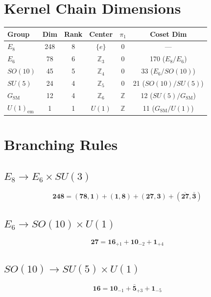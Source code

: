 \documentclass[11pt,a4paper,openright]{book}
\theoremstyle{plain}
\theoremstyle{definition}
\newcommand{\SM}{\mathrm{SM}}
\newcommand{\Z}{\mathbb{Z}}
\begin{document}
\section{Kernel Chain Dimensions}

\begin{center}
\begin{tabular}{lccccc}
\toprule
\textbf{Group} & \textbf{Dim} & \textbf{Rank} & \textbf{Center} & $\pi_1$ & \textbf{Coset Dim} \\
\midrule
$E_8$ & 248 & 8 & $\{e\}$ & $0$ & --- \\
$E_6$ & 78 & 6 & $\Z_3$ & $0$ & 170 ($E_8/E_6$) \\
$SO(10)$ & 45 & 5 & $\Z_4$ & $0$ & 33 ($E_6/SO(10)$) \\
$SU(5)$ & 24 & 4 & $\Z_5$ & $0$ & 21 ($SO(10)/SU(5)$) \\
$G_{\SM}$ & 12 & 4 & $\Z_6$ & $\Z$ & 12 ($SU(5)/G_{\SM}$) \\
$U(1)_{\mathrm{em}}$ & 1 & 1 & $U(1)$ & $\Z$ & 11 ($G_{\SM}/U(1)$) \\
\bottomrule
\end{tabular}
\end{center}

\section{Branching Rules}

\subsection{$E_8 \to E_6 \times SU(3)$}
\begin{equation}
\mathbf{248} = (\mathbf{78}, \mathbf{1}) + (\mathbf{1}, \mathbf{8}) + (\mathbf{27}, \mathbf{3}) + (\overline{\mathbf{27}}, \bar{\mathbf{3}})
\end{equation}

\subsection{$E_6 \to SO(10) \times U(1)$}
\begin{equation}
\mathbf{27} = \mathbf{16}_{+1} + \mathbf{10}_{-2} + \mathbf{1}_{+4}
\end{equation}

\subsection{$SO(10) \to SU(5) \times U(1)$}
\begin{equation}
\mathbf{16} = \mathbf{10}_{-1} + \bar{\mathbf{5}}_{+3} + \mathbf{1}_{-5}
\end{equation}
\end{document}
